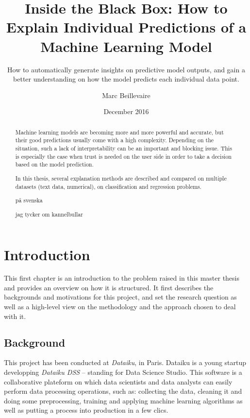 \documentclass[a4paper,11pt]{kth-mag}
\title{Inside the Black Box: How to Explain Individual Predictions of a Machine Learning Model}
\subtitle{How to automatically generate insights on predictive model outputs, and gain 
	a better understanding on how the model predicts each individual data point.}
\author{Marc Beillevaire}
\date{December 2016}
\begin{document}
\frontmatter
\maketitle


\begin{abstract}
Machine learning models are becoming more and more powerful and accurate, but their good predictions usually come with a high complexity. Depending on the situation, such a lack of interpretability can be an important and blocking issue. This is especially the case when trust is needed on the user side in order to take a decision based on the model prediction.

In this thesis, several explanation methods are described and compared on multiple datasets (text data, numerical), on classification and regression problems.
\end{abstract}

\clearpage
{}
\begin{abstract}
på svenska

jag tycker om kannelbullar
\end{abstract}
\clearpage
\tableofcontents
\mainmatter



\chapter{Introduction}

This first chapter is an introduction to the problem raised in this master thesis and provides an overview on how it is structured. It first describes the backgrounds and motivations for this project, and set the research question as well as a high-level view on the methodology and the approach chosen to deal with it.

\section{Background}

This project has been conducted at \textit{Dataiku}, in Paris. Dataiku is a young startup developping \textit{Dataiku DSS} -- standing for Data Science Studio. This software is a collaborative plateform on which data scientists and data analysts can easily perform data processing operations, such as: collecting the data, cleaning it and doing some preprocessing, training and applying machine learning algorithms as well as putting a process into production in a few clics.
\end{document}
